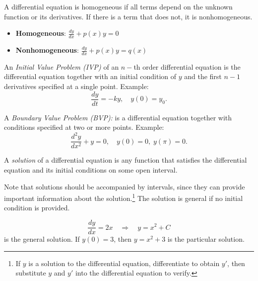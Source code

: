 \begin{definition}
    A differential equation is homogeneous if all terms depend on the unknown function or its derivatives. If there is a term that does not, it is nonhomogeneous.
    \begin{itemize}
        \item \textbf{Homogeneous}: $\frac{dy}{dx} + p(x)y = 0$
        \item \textbf{Nonhomogeneous}: $\frac{dy}{dx} + p(x)y = q(x)$
    \end{itemize}
\end{definition}

\begin{definition}
    An \emph{Initial Value Problem (IVP)} of an \(n-\)th order differential equation is the differential equation together with an initial condition of \(y\) and the first \(n-1\) derivatives specified at a single point.  
    Example:
    \[
    \frac{dy}{dt} = -ky, \quad y(0)=y_0.
    \]
\end{definition}

\begin{definition}
    A \emph{Boundary Value Problem (BVP):} is a differential equation together with conditions specified at two or more points.  
    Example:
    \[
    \frac{d^2y}{dx^2} + y = 0, \quad y(0)=0, \; y(\pi)=0.
    \]
\end{definition} 

\begin{definition}
    A \emph{solution} of a diﬀerential equation is any function that satisﬁes the diﬀerential equation and its initial conditions on some open interval.
\end{definition}
Note that solutions should be accompanied by intervals, since they can provide important information about the solution.\footnote{If \(y\) is a solution to the differential equation, differentiate to obtain \(y'\), then substitute \(y\) and \(y'\) into the differential equation to verify.}
The solution is general if no initial condition is provided.

\begin{example}
    \[
    \frac{dy}{dx} = 2x \quad \Rightarrow \quad y = x^2 + C
    \]  
    is the general solution.  
    If $y(0) = 3$, then $y = x^2 + 3$ is the particular solution.
\end{example}

